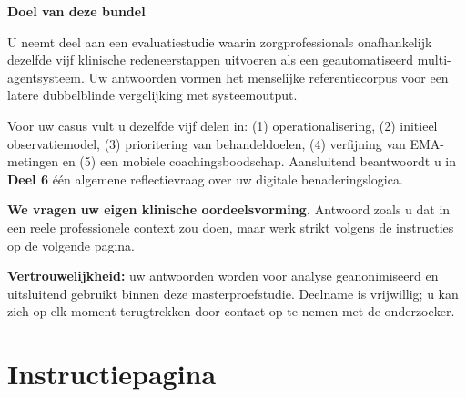 \documentclass[11pt,a4paper]{article}
\begin{document}
\vspace{0.4cm}

\begin{center}
\begin{tcolorbox}[
  colback=SoftBG,colframe=BorderGrey,
  arc=2mm,left=10pt,right=10pt,top=9pt,bottom=9pt,
  width=0.92\textwidth
]
\textbf{\color{PrimaryBlue}Doel van deze bundel}

\medskip\small
U neemt deel aan een evaluatiestudie waarin zorgprofessionals onafhankelijk dezelfde
vijf klinische redeneerstappen uitvoeren als een geautomatiseerd multi-agentsysteem. Uw antwoorden
vormen het menselijke referentiecorpus voor een latere dubbelblinde vergelijking
met systeemoutput.

\smallskip
Voor uw casus vult u dezelfde vijf delen in: (1) operationalisering,
(2) initieel observatiemodel, (3) prioritering van behandeldoelen, (4) verfijning van
EMA-metingen en (5) een mobiele coachingsboodschap. Aansluitend beantwoordt u in
\textbf{Deel 6} één algemene reflectievraag over uw digitale benaderingslogica.

\smallskip
\textbf{We vragen uw eigen klinische oordeelsvorming.} Antwoord zoals u dat in een
reele professionele context zou doen, maar werk strikt volgens de instructies op de
volgende pagina.
\end{tcolorbox}
\end{center}

\vspace{0.4cm}

\begin{center}
\begin{tcolorbox}[
  colback=AccentAmber,colframe=GoldAmber,
  arc=2mm,boxrule=0.7pt,left=10pt,right=10pt,top=8pt,bottom=8pt,
  width=0.90\textwidth
]
\small\centering
\textbf{\color{GoldAmber}Vertrouwelijkheid:} uw antwoorden worden voor analyse
geanonimiseerd en uitsluitend gebruikt binnen deze masterproefstudie. Deelname is
vrijwillig; u kan zich op elk moment terugtrekken door contact op te nemen met de
onderzoeker.
\end{tcolorbox}
\end{center}

\vfill
\newpage
\tableofcontents
\newpage


\section{Instructiepagina}
\end{document}
